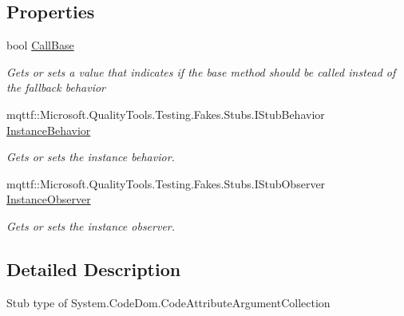 \subsection*{Properties}
\begin{DoxyCompactItemize}
\item 
bool \hyperlink{class_system_1_1_code_dom_1_1_fakes_1_1_stub_code_attribute_argument_collection_a7a2e2bdb4d8723e7ce05f3818e2a637a}{Call\-Base}
\begin{DoxyCompactList}\small\item\em Gets or sets a value that indicates if the base method should be called instead of the fallback behavior\end{DoxyCompactList}\item 
mqttf\-::\-Microsoft.\-Quality\-Tools.\-Testing.\-Fakes.\-Stubs.\-I\-Stub\-Behavior \hyperlink{class_system_1_1_code_dom_1_1_fakes_1_1_stub_code_attribute_argument_collection_a1ad32f83f49bfcaac0839331a8133d48}{Instance\-Behavior}
\begin{DoxyCompactList}\small\item\em Gets or sets the instance behavior.\end{DoxyCompactList}\item 
mqttf\-::\-Microsoft.\-Quality\-Tools.\-Testing.\-Fakes.\-Stubs.\-I\-Stub\-Observer \hyperlink{class_system_1_1_code_dom_1_1_fakes_1_1_stub_code_attribute_argument_collection_a0e5823ab0726b9dec6cbfaa63745d157}{Instance\-Observer}
\begin{DoxyCompactList}\small\item\em Gets or sets the instance observer.\end{DoxyCompactList}\end{DoxyCompactItemize}


\subsection{Detailed Description}
Stub type of System.\-Code\-Dom.\-Code\-Attribute\-Argument\-Collection



